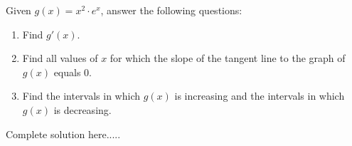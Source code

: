 \begin{example}
Given $g(x)=x^2\cdot e^x$, answer the following questions:
\renewcommand{\labelenumi}{\textbf{(\alph{enumi})}}
\begin{enumerate}[leftmargin=*]
\item Find $g'(x)$.
\item Find all values of $x$ for which the slope of the tangent line to the graph of $g(x)$ equals 0.
\newpage
\item Find the intervals in which $g(x)$ is increasing and the intervals in which $g(x)$ is decreasing.
\end{enumerate}
    \begin{sol}
    \end{sol}
    \begin{solL}
    Complete solution here.....
    
    \end{solL}
    
\end{example}

